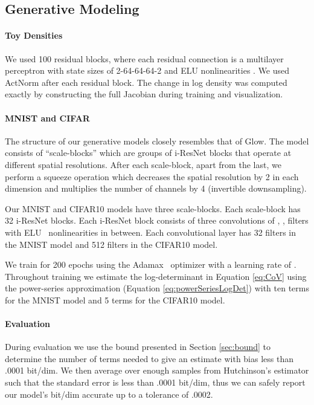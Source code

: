 \documentclass{article}
\begin{document}
\subsection{Generative Modeling}
\label{sec:gen_details}
\paragraph{Toy Densities} We used 100 residual blocks, where each residual connection is a multilayer perceptron with state sizes of 2-64-64-64-2 and ELU nonlinearities \citep{DBLP:journals/corr/ClevertUH15}. We used ActNorm \citep{kingma2018glow} after each residual block. The change in log density was computed exactly by constructing the full Jacobian during training and visualization.

\paragraph{MNIST and CIFAR}
The structure of our generative models closely resembles that of Glow. The model consists of ``scale-blocks'' which are groups of i-ResNet blocks that operate at different spatial resolutions. After each scale-block, apart from the last, we perform a squeeze operation which decreases the spatial resolution by 2 in each dimension and multiplies the number of channels by 4 (invertible downsampling). 

Our MNIST and CIFAR10 models have three scale-blocks. Each scale-block has 32 i-ResNet blocks. Each i-ResNet block consists of three convolutions of , ,  filters with ELU~\citep{DBLP:journals/corr/ClevertUH15} nonlinearities in between. Each convolutional layer has 32 filters in the MNIST model and 512 filters in the CIFAR10 model.

We train for 200 epochs using the Adamax~\citep{kingma2014adam} optimizer with a learning rate of . Throughout training we estimate the log-determinant in Equation \eqref{eq:CoV} using the power-series approximation (Equation \eqref{eq:powerSeriesLogDet}) with ten terms for the MNIST model and 5 terms for the CIFAR10 model. 

\paragraph{Evaluation} During evaluation we use the bound presented in Section \ref{sec:bound} to determine the number of terms needed to give an estimate with bias less than .0001 bit/dim. We then average over enough samples from Hutchinson's estimator such that the standard error is less than .0001 bit/dim, thus we can safely report our model's bit/dim accurate up to a tolerance of .0002.
\end{document}
